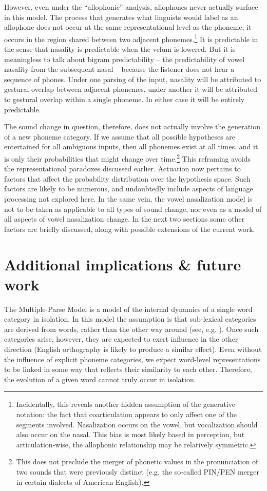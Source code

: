 However, even under the “allophonic” analysis, allophones never
actually surface in this model. The process that generates what linguists
would label as an allophone does not occur at the same representational
level as the phoneme; it occurs in the region shared between two adjacent
phonemes.\footnote{Incidentally, this reveals another hidden assumption of the generative
notation: the fact that coarticulation appears to only affect one
of the segments involved. Nasalization occurs on the vowel, but vocalization
should also occur on the nasal. This bias is most likely based in
perception, but articulation-wise, the allophonic relationship may
be relatively symmetric.} It is predictable in the sense that nasality is predictable when
the velum is lowered. But it is meaningless to talk about bigram predictability
– the predictability of vowel nasality from the subsequent nasal –
because the listener does not hear a sequence of phones. Under one
parsing of the input, nasality will be attributed to gestural
overlap between adjacent phonemes, under another it will be attributed
to gestural overlap within a single phoneme. In either case it will
be entirely predictable. 

The sound change in question, therefore, does not actually involve
the generation of a new phoneme category. If we assume that all possible
hypotheses are entertained for all ambiguous inputs, then all phonemes
exist at all times, and it is only their probabilities that might
change over time.\footnote{This does not preclude the merger of phonetic values in the pronunciation
of two sounds that were previously distinct (e.g. the so-called PIN/PEN
merger in certain dialects of American English).} This reframing avoids the representational paradoxes discussed
earlier. Actuation now pertains to factors that affect the probability
distribution over the hypothesis space. Such factors are likely to
be numerous, and undoubtedly include aspects of language processing
not explored here. In the same vein, the vowel nasalization model
is not to be taken as applicable to all types of sound change, nor
even as a model of all aspects of vowel nasalization change. In
the next two sections some other factors are briefly discussed, along
with possible extensions of the current work.

\section{Additional implications \& future work}

The Multiple-Parse Model is a model of the internal dynamics of a
single word category in isolation. In this model the assumption is
that sub-lexical categories are derived from words, rather than the
other way around (see, e.g. \citealp{beckman2000ontogeny}). Once
such categories arise, however, they are expected to exert influence
in the other direction (English orthography is likely to produce a
similar effect). Even without the influence of explicit phoneme categories,
we expect word-level representations to be linked in some way that
reflects their similarity to each other. Therefore, the evolution of a given
word cannot truly occur in isolation. 

